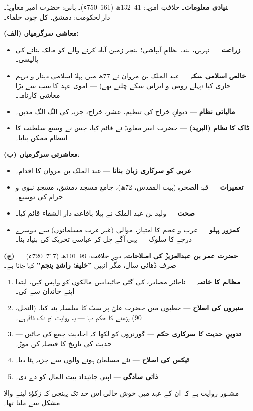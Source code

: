 \begin{hal}
\textbf{بنیادی معلومات۔} خلافتِ امویہ: \textenglish{41--132}ھ
(\textenglish{661--750}ء)۔ بانی: حضرت امیر معاویہؓ۔ دارالحکومت: دمشق۔ کل چودہ
خلفاء۔

\medskip
\textbf{(الف) معاشی سرگرمیاں:}
\begin{itemize}\setlength{\itemsep}{1pt}
  \item \textbf{زراعت} --- نہریں، بند، نظامِ آبپاشی؛ بنجر زمین آباد کرنے والے
        کو مالک بنانے کی پالیسی۔
  \item \textbf{خالص اسلامی سکہ} --- عبد الملک بن مروان نے \textenglish{77}ھ
        میں پہلا اسلامی دینار و درہم جاری کیا (پہلے رومی و ایرانی سکے چلتے
        تھے) --- اموی عہد کا سب سے بڑا معاشی کارنامہ۔
  \item \textbf{مالیاتی نظام} --- دیوانِ خراج کی تنظیم، عشر، خراج، جزیہ کی
        الگ الگ مدیں۔
  \item \textbf{ڈاک کا نظام (البرید)} --- حضرت امیر معاویہؓ نے قائم کیا، جس نے
        وسیع سلطنت کا انتظام ممکن بنایا۔
\end{itemize}

\medskip
\textbf{(ب) معاشرتی سرگرمیاں:}
\begin{itemize}\setlength{\itemsep}{1pt}
  \item \textbf{عربی کو سرکاری زبان بنانا} --- عبد الملک بن مروان کا اقدام۔
  \item \textbf{تعمیرات} --- قبۃ الصخرہ (بیت المقدس، \textenglish{72}ھ)، جامع
        مسجد دمشق، مسجدِ نبوی و حرام کی توسیع۔
  \item \textbf{صحت} --- ولید بن عبد الملک نے پہلا باقاعدہ دار الشفاء قائم
        کیا۔
  \item \textbf{کمزور پہلو} --- عرب و عجم کا امتیاز، موالی (غیر عرب مسلمانوں)
        سے دوسرے درجے کا سلوک --- یہی آگے چل کر عباسی تحریک کی بنیاد بنا۔
\end{itemize}

\medskip
\textbf{(ج) حضرت عمر بن عبدالعزیزؒ کی اصلاحات۔} دورِ خلافت:
\textenglish{99--101}ھ (\textenglish{717--720}ء) --- صرف ڈھائی سال، مگر انہیں
\textbf{''خلیفۂ راشدِ پنجم''} کہا جاتا ہے۔

\begin{enumerate}\setlength{\itemsep}{1pt}
  \item \textbf{مظالم کا خاتمہ} --- ناجائز مصادرہ کی گئی جائیدادیں مالکوں کو
        واپس کیں، ابتدا اپنے خاندان سے کی۔
  \item \textbf{منبروں کی اصلاح} --- خطبوں میں حضرت علیؓ پر سبّ کا سلسلہ بند
        کیا:  (النحل،
        \textenglish{90}) پڑھنے کا حکم دیا --- یہ روایت آج تک قائم ہے۔
  \item \textbf{تدوینِ حدیث کا سرکاری حکم} --- گورنروں کو لکھا کہ احادیث جمع
        کی جائیں --- حدیث کی تاریخ کا فیصلہ کن موڑ۔
  \item \textbf{ٹیکس کی اصلاح} --- نئے مسلمان ہونے والوں سے جزیہ ہٹا دیا۔
  \item \textbf{ذاتی سادگی} --- اپنی جائیداد بیت المال کو دے دی۔
\end{enumerate}

\smallskip
مشہور روایت ہے کہ ان کے عہد میں خوش حالی اس حد تک پہنچی کہ زکوٰۃ لینے والا
مشکل سے ملتا تھا۔
\end{hal}

